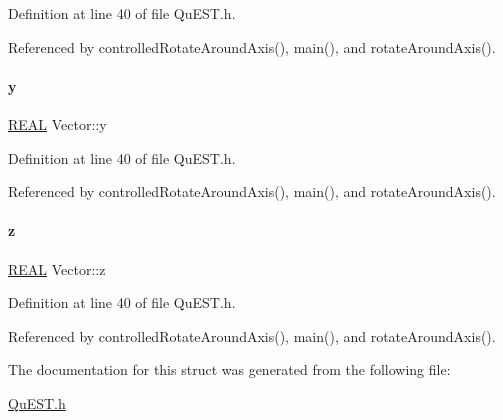 Definition at line 40 of file Qu\+E\+S\+T.\+h.



Referenced by controlled\+Rotate\+Around\+Axis(), main(), and rotate\+Around\+Axis().

\mbox{\label{structVector_a375ca805d4c808a53d7c4e0c737ae3de}} 
\paragraph{\texorpdfstring{y}{y}}
{\footnotesize\ttfamily \mbox{\hyperlink{QuEST__precision_8h_a4b654506f18b8bfd61ad2a29a7e38c25}{R\+E\+AL}} Vector\+::y}



Definition at line 40 of file Qu\+E\+S\+T.\+h.



Referenced by controlled\+Rotate\+Around\+Axis(), main(), and rotate\+Around\+Axis().

\mbox{\label{structVector_ad4e863651be7d6b7e2b28cd7445a0ccf}} 
\paragraph{\texorpdfstring{z}{z}}
{\footnotesize\ttfamily \mbox{\hyperlink{QuEST__precision_8h_a4b654506f18b8bfd61ad2a29a7e38c25}{R\+E\+AL}} Vector\+::z}



Definition at line 40 of file Qu\+E\+S\+T.\+h.



Referenced by controlled\+Rotate\+Around\+Axis(), main(), and rotate\+Around\+Axis().



The documentation for this struct was generated from the following file\+:\begin{DoxyCompactItemize}
\item 
\mbox{\hyperlink{QuEST_8h}{Qu\+E\+S\+T.\+h}}\end{DoxyCompactItemize}

